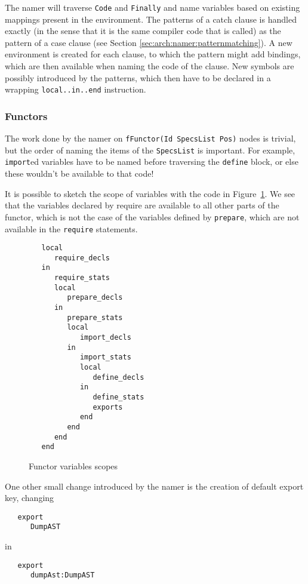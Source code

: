 \documentclass[a4paper]{memoir}
\begin{document}
The namer will traverse \lstinline!Code! and \lstinline!Finally! and name variables based on existing
mappings present in the environment. The patterns of a catch clause is
handled exactly (in the sense that it is the same compiler code that is called)
as the pattern of a case clause (see Section \ref{sec:arch:namer:patternmatching}).
A new environment is created for each clause, to which the pattern might add
bindings, which are then available when naming the code of the clause.
New symbols are possibly introduced by the patterns, which then have to be
declared in a wrapping \lstinline!local..in..end! instruction.

\subsubsection{Functors}\label{sec:arch:namer:functors}
The work done by the namer on \lstinline!fFunctor(Id SpecsList Pos)! nodes is trivial, but the
order of naming the items of the \lstinline!SpecsList! is important. For
example, \lstinline!import!ed variables have to be named before traversing the
\lstinline!define! block, or else these wouldn't be available to that code!

It is possible to sketch the scope of variables with the code in
Figure~\ref{fig:functors_scope}. We see that the variables declared by require
are available to all other parts of the functor, which is not the case of the
variables defined by \lstinline!prepare!, which are not available in the
\lstinline!require! statements. 

\begin{figure}[ht]
\begin{lstlisting}
   local
      require_decls
   in
      require_stats
      local
         prepare_decls
      in
         prepare_stats
         local
            import_decls
         in
            import_stats
            local
               define_decls
            in
               define_stats
               exports
            end
         end
      end
   end
\end{lstlisting}
\caption{Functor variables scopes}
\label{fig:functors_scope}
\end{figure}

One other small change introduced by the namer is the creation of default export
key, changing
\begin{lstlisting}
   export
      DumpAST
\end{lstlisting}
in
\begin{lstlisting}
   export
      dumpAst:DumpAST
\end{lstlisting}
\end{document}
